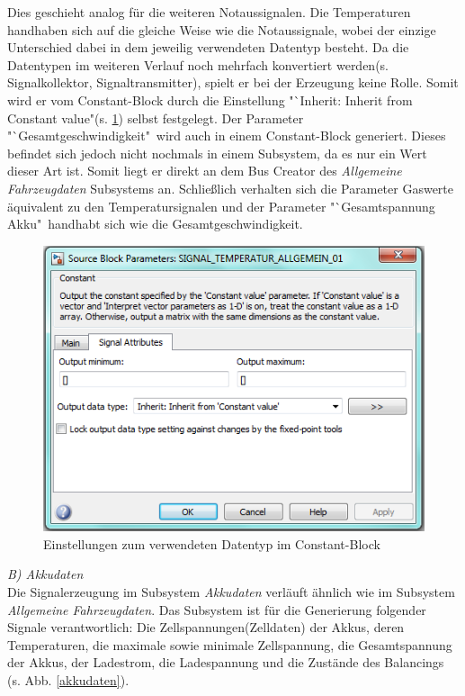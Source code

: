 \documentclass[fontsize = 12pt, paper = a4]{scrreprt}
\begin{document}
Dies geschieht analog für die weiteren Notaussignalen. Die Temperaturen handhaben sich auf die gleiche Weise wie die Notaussignale, wobei der einzige Unterschied dabei in dem jeweilig verwendeten Datentyp besteht. Da die Datentypen im weiteren Verlauf noch mehrfach konvertiert werden(s. Signalkollektor, Signaltransmitter), spielt er bei der Erzeugung keine Rolle. Somit wird er vom Constant-Block durch die Einstellung "`Inherit: Inherit from Constant value"(s. \ref{constdatentyp}) selbst festgelegt. Der Parameter "`Gesamtgeschwindigkeit"\ wird auch in einem Constant-Block generiert. Dieses befindet sich jedoch nicht nochmals in einem Subsystem, da es nur ein Wert dieser Art ist. Somit liegt er direkt an dem Bus Creator des \textit{Allgemeine Fahrzeugdaten} Subsystems an. Schließlich verhalten sich die Parameter Gaswerte äquivalent zu den Temperatursignalen und der Parameter "`Gesamtspannung Akku"\ handhabt sich wie die Gesamtgeschwindigkeit.


\begin{figure}[h]
\centering
\includegraphics[scale = 0.8]{const_datentyp}
\caption[Enstellungen zum Datentyp im Constant-Block ]{Einstellungen zum verwendeten Datentyp im Constant-Block}
\label{constdatentyp}
\end{figure}

\textit{B) Akkudaten} \\

Die Signalerzeugung im Subsystem \textit{Akkudaten} verläuft ähnlich wie im Subsystem \textit{Allgemeine Fahrzeugdaten}. Das Subsystem ist für die Generierung folgender Signale verantwortlich: Die Zellspannungen(Zelldaten) der Akkus, deren Temperaturen, die maximale sowie minimale Zellspannung, die Gesamtspannung der Akkus, der Ladestrom, die Ladespannung und die Zustände des Balancings (s. Abb. \ref{akkudaten}). \\
\end{document}
